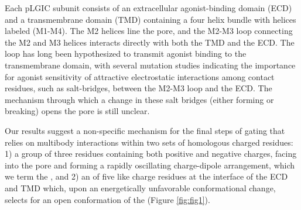 \documentclass[9pt,twocolumn,twoside,lineno]{pnas-new}
\begin{document}
Each pLGIC subunit consists of an extracellular agonist-binding domain (ECD) and a transmembrane domain (TMD) containing a four helix bundle with helices labeled (M1-M4).  The M2 helices line the pore, and the M2-M3 loop connecting the M2 and M3 helices interacts directly with both the TMD and the ECD.  The loop has long been hypothesized to transmit agonist binding to the transmembrane domain,\cite{Campos-Caro1996,Grosman2000,Lummis2005,Lee2005,Unwin2005, Lee2009} with several mutation studies indicating the importance for agonist sensitivity of attractive electrostatic interactions among contact residues, such as salt-bridges, between the M2-M3 loop and the ECD. \cite{Sigel1999, OShea2000, Kash2003, Hales2006} The mechanism through which a change in these salt bridges (either forming or breaking) opens the pore is still unclear.   

Our results suggest a non-specific mechanism for the final steps of gating that relies on multibody interactions within two sets of homologous charged residues: 1) a group of three residues containing both positive and negative charges, facing into the pore and forming a rapidly oscillating charge-dipole arrangement, which we term the \triadns, and 2) an \fivering of five like charge residues at the interface of the ECD and TMD which, upon an energetically unfavorable conformational change, selects for an open conformation of the \triadns  (Figure \ref{fig:fig1}).  
\end{document}
